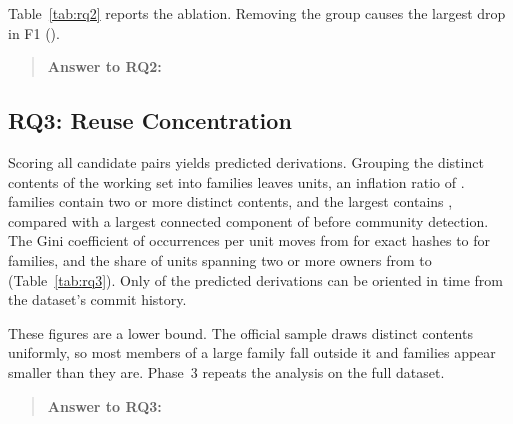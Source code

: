 Table~\ref{tab:rq2} reports the ablation. Removing the \ResTopAblation{} group causes the
largest drop in F1 (\ResTopAblationDrop{}).

\begin{quote}
\textbf{Answer to RQ2:} 
\end{quote}

\subsection{RQ3: Reuse Concentration}

\begin{table}[t]
\caption{RQ3: reuse concentration by exact hash and by derivation family. The last column
covers the whole in-scope population of the sample at the exact-hash level.}
\label{tab:rq3}
\small
{}
\end{table}

Scoring all \ResCandPairs{} candidate pairs yields \ResDerivedEdges{} predicted derivations.
Grouping the \ResWorkHashes{} distinct contents of the working set into families leaves
\ResFamilies{} units, an inflation ratio of \ResInflation{}. \ResMultiFamilies{} families
contain two or more distinct contents, and the largest contains \ResLargestFamily{}, compared
with a largest connected component of \ResLargestCC{} before community detection. The Gini
coefficient of occurrences per unit moves from \ResGiniHash{} for exact hashes to
\ResGiniFam{} for families, and the share of units spanning two or more owners from
\ResCrossHash{} to \ResCrossFam{} (Table~\ref{tab:rq3}). Only \ResOrient{} of the predicted
derivations can be oriented in time from the dataset's commit history.

These figures are a lower bound. The official sample draws distinct contents uniformly, so most
members of a large family fall outside it and families appear smaller than they are. Phase~3
repeats the analysis on the full dataset.

\begin{quote}
\textbf{Answer to RQ3:} 
\end{quote}
